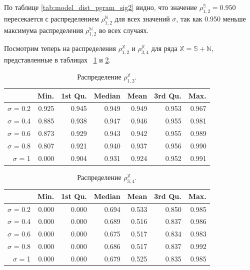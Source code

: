\documentclass[specialist,
               substylefile = spbu.rtx,
               subf,href,colorlinks=true, 12pt]{disser}
\begin{document}
По таблице \ref{tab:model_dist_pgram_sig2} видно, что значение $\rho^{\mathbb{S}}_{1,2} = 0.950$ пересекается с распределением $\rho^{\mathbb{N}}_{1,2}$ для всех значений $\sigma$, так как 0.950 меньше максимума  распределения $\rho^{\mathbb{N}}_{1,2}$ во всех случаях.

Посмотрим теперь на распределения  $\rho^{\mathbb{X}}_{1,2}$ и  $\rho^{\mathbb{X}}_{3,4}$ для ряда $\mathbb{X} = \mathbb{S} + \mathbb{N}$, представленные в таблицах ~\ref{tab:model_dist_pgram_sig_noise2} и \ref{tab:model_dist_pgram_sig_noise22}.

\begin{table}[hhh!]
\caption{Распределение $\rho^{\mathbb{X}}_{1,2}$.}
\centering
\begin{tabular}{rrrrrrr}
  \hline
 & Min. & 1st Qu. & Median & Mean & 3rd Qu. & Max. \\
  \hline
$\sigma$ = 0.2 & 0.925 & 0.945 & 0.949 & 0.949 & 0.953 & 0.967 \\ 
  $\sigma$ = 0.4 & 0.885 & 0.938 & 0.947 & 0.946 & 0.955 & 0.981 \\ 
  $\sigma$ = 0.6 & 0.873 & 0.929 & 0.943 & 0.942 & 0.955 & 0.989 \\ 
  $\sigma$ = 0.8 & 0.807 & 0.921 & 0.940 & 0.937 & 0.956 & 0.990 \\ 
  $\sigma$ = 1 & 0.000 & 0.904 & 0.931 & 0.924 & 0.952 & 0.991 \\ 
   \hline
\end{tabular}
\label{tab:model_dist_pgram_sig_noise2}
\end{table}

\begin{table}[hhh!]
\caption{Распределение $\rho^{\mathbb{X}}_{3,4}$.}
\centering
\begin{tabular}{rrrrrrr}
  \hline
 & Min. & 1st Qu. & Median & Mean & 3rd Qu. & Max. \\
  \hline
$\sigma$ = 0.2 & 0.000 & 0.000 & 0.694 & 0.533 & 0.850 & 0.985 \\ 
  $\sigma$ = 0.4 & 0.000 & 0.000 & 0.689 & 0.516 & 0.837 & 0.986 \\ 
  $\sigma$ = 0.6 & 0.000 & 0.000 & 0.675 & 0.517 & 0.834 & 0.983 \\ 
  $\sigma$ = 0.8 & 0.000 & 0.000 & 0.686 & 0.517 & 0.837 & 0.992 \\ 
  $\sigma$ = 1 & 0.000 & 0.000 & 0.679 & 0.525 & 0.835 & 0.985 \\ 
   \hline
\end{tabular}
\label{tab:model_dist_pgram_sig_noise22}
\end{table}
\end{document}
